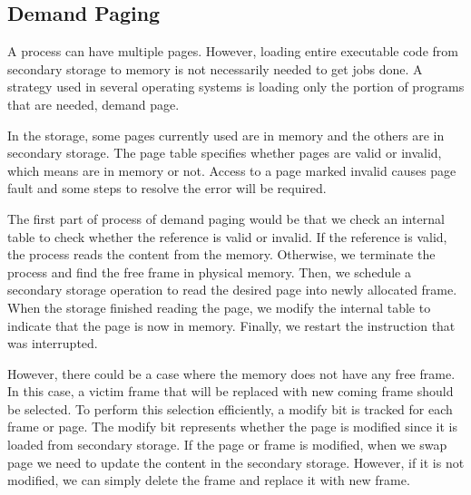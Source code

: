\subsection{Demand Paging}
\label{sec:os_paging}
A process can have multiple pages. However, loading entire executable code from secondary storage to memory is not necessarily needed to 
get jobs done. A strategy used in several operating systems is loading only the portion of programs that are needed, demand page. 

In the storage, some pages currently used are in memory and the others are in secondary storage. 
The page table specifies whether pages are valid or invalid, which means are in memory or not. 
Access to a page marked invalid causes page fault and some steps to resolve the error will be required. 

The first part of process of demand paging would be that we check an internal table to check whether the reference is valid or invalid.
If the reference is valid, the process reads the content from the memory. Otherwise, we terminate the process and find the free frame in 
physical memory. Then, we schedule a secondary storage operation to read the desired page into newly allocated frame. 
When the storage finished reading the page, we modify the internal table to indicate that the page is now in memory. 
Finally, we restart the instruction that was interrupted. 

However, there could be a case where the memory does not have any free frame. In this case, a victim frame that will be replaced with new coming frame should be selected. 
To perform this selection efficiently, a modify bit is tracked for each frame or page. The modify bit represents whether the page is modified since it is loaded from secondary storage. 
If the page or frame is modified, when we swap page we need to update the content in the secondary storage. However, if it is not modified, we can simply delete the frame and replace it with new frame.





